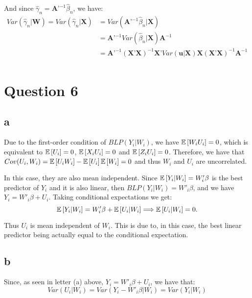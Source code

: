 \documentclass[12pt]{paper}
\begin{document}
And since $\hat{\gamma}_n=\textbf{A'}^{-1}\hat{\beta}_n$, we have:
\begin{equation}
\begin{split}
Var(\hat{\gamma}_n|\textbf{W})=Var(\hat{\gamma}_n|\textbf{X})&=Var(\textbf{A'}^{-1}\hat{\beta}_n|\textbf{X})\\
&=\textbf{{A'}}^{-1}Var(\hat{\beta}_n|\textbf{X})\textbf{A}^{-1}\\
&=\textbf{{A'}}^{-1}(\textbf{X'X})^{-1}\textbf{X'}Var(\textbf{u}|\textbf{X})\textbf{X}(\textbf{X'X})^{-1}\textbf{A}^{-1}\\
\end{split}
\end{equation}


\section*{Question 6}

\subsection*{a}

Due to the first-order condition of $BLP(Y_i|W_i)$, we have $\mathbb{E} \left [ W_iU_i \right ]=0$, which is equivalent to $\mathbb{E} \left [ U_i \right ]=0$, $\mathbb{E} \left [ X_iU_i \right ]=0$ and $\mathbb{E} \left [ Z_iU_i \right ]=0$. Therefore, we have that $Cov(U_i,W_i)=\mathbb{E} \left [ U_iW_i \right ]-\mathbb{E} \left [ U_i \right ]\mathbb{E} \left [ W_i \right ]=0$ and thus $W_i$ and $U_i$ are uncorrelated.

In this case, they are also mean independent. Since $\mathbb{E} \left [ Y_i|W_i \right ]=W'_i\beta$ is the best predictor of $Y_i$ and it is also linear, then $BLP(Y_i|W_i)=W'_i\beta$, and we have $Y_i=W'_i\beta+U_i$. Taking conditional expectations we get:
\begin{equation}
\mathbb{E} \left [ Y_i|W_i \right ]=W'_i\beta+\mathbb{E} \left [ U_i|W_i \right ] \Longrightarrow \mathbb{E} \left [ U_i|W_i \right ]=0.
\end{equation}

Thus $U_i$ is mean independent of $W_i$. This is due to, in this case, the best linear predictor being actually equal to the conditional expectation. 

\subsection*{b}

Since, as seen in letter (a) above, $Y_i=W'_i\beta+U_i$, we have that:
\begin{equation}
Var(U_i|W_i)=Var(Y_i-W'_i\beta|W_i)=Var(Y_i|W_i)
\end{equation}
\end{document}
